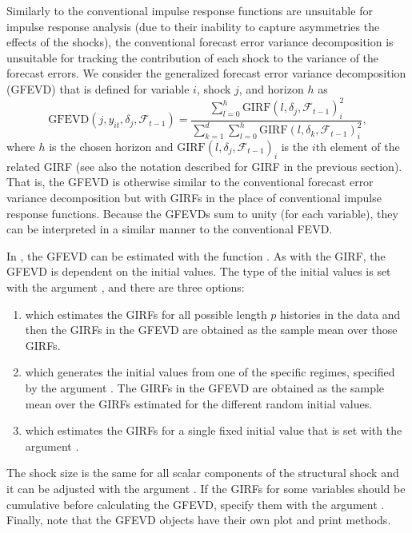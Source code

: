 \documentclass[nojss]{jss}
\begin{document}
Similarly to the conventional impulse response functions are unsuitable for impulse response analysis (due to their inability to capture asymmetries the effects of the shocks), the conventional forecast error variance decomposition is unsuitable for tracking the contribution of each shock to the variance of the forecast errors. We consider the generalized forecast error variance decomposition (GFEVD) \citep{Lanne+Nyberg:2016}  that is defined for variable $i$, shock $j$, and horizon $h$ as
\begin{equation}
\text{GFEVD}(j,y_{it}, \delta_j,\mathcal{F}_{t-1}) = \frac{\sum_{l=0}^h\text{GIRF}(l,\delta_j,\mathcal{F}_{t-1})_i^2}{\sum_{k=1}^d\sum_{l=0}^h\text{GIRF}(l,\delta_k,\mathcal{F}_{t-1})_i^2},
\end{equation}
where $h$ is the chosen horizon and $\text{GIRF}(l,\delta_j,\mathcal{F}_{t-1})_i$ is the $i$th element of the related GIRF (see also the notation described for GIRF in the previous section). That is, the GFEVD is otherwise similar to the conventional forecast error variance decomposition but with GIRFs in the place of conventional impulse response functions. Because the GFEVDs sum to unity (for each variable), they can be interpreted in a similar manner to the conventional FEVD.

In , the GFEVD can be estimated with the function . As with the GIRF, the GFEVD is dependent on the initial values. The type of the initial values is set with the argument , and there are three options:
\begin{enumerate}
\item {} which estimates the GIRFs for all possible length $p$ histories in the data and then the GIRFs in the GFEVD are obtained as the sample mean over those GIRFs.
\item {} which generates the initial values from one of the specific regimes, specified by the argument . The GIRFs in the GFEVD are obtained as the sample mean over the GIRFs estimated for the different random initial values.
\item {} which estimates the GIRFs for a single fixed initial value that is set with the argument .
\end{enumerate}
The shock size is the same for all scalar components of the structural shock and it can be adjusted with the argument . If the GIRFs for some variables should be cumulative before calculating the GFEVD, specify them with the argument . Finally, note that the GFEVD objects have their own plot and print methods.
\end{document}
